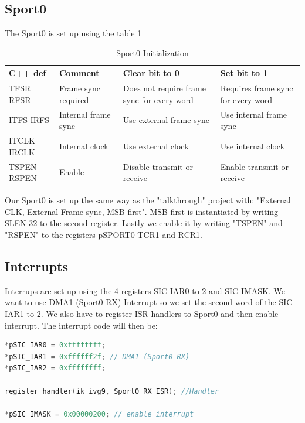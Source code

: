 \subsection{Sport0}
The Sport0 is set up using the table \ref{table:Sport0}
\begin{table}[htbp]
    \begin{tabular}{| p{1.5cm} | l | p{4.5cm} | p{4.5cm} |}
    \hline
    C++ def      & Comment                   & Clear bit to 0                                   & Set bit to 1                             \\ \hline
    TFSR RFSR   & Frame sync required 		 & Does not require frame sync for every word & Requires frame  					sync for every word \\ \hline
    ITFS IRFS   & Internal frame  					sync & Use external  					frame sync                    & Use internal  					frame sync            \\ \hline
    ITCLK IRCLK & Internal clock            & Use external  					clock                         & Use internal  					clock                 \\ \hline
    TSPEN RSPEN & Enable                    & Disable transmit  					or receive                & Enable transmit  					or receive         \\ \hline
    \end{tabular}
    \caption{Sport0 Initialization}
    \label{table:Sport0}
\end{table}
Our Sport0 is set up the same way as the "talkthrough" project with: "External CLK, External Frame sync, MSB first". MSB first is instantiated by writing SLEN$\_$32 to the second register. Lastly we enable it by writing "TSPEN" and "RSPEN" to the registers pSPORT0 TCR1 and RCR1.
\subsection{Interrupts}
Interrups are set up using the 4 registers SIC$\_$IAR0 to 2 and SIC$\_$IMASK. We want to use DMA1 (Sport0 RX) Interrupt so we set the second word of the SIC$\_$IAR1 to 2. We also have to register ISR handlers to Sport0 and then enable interrupt. The interrupt code will then be:
\begin{lstlisting}[language=C]
*pSIC_IAR0 = 0xffffffff;
*pSIC_IAR1 = 0xffffff2f; // DMA1 (Sport0 RX)
*pSIC_IAR2 = 0xffffffff;

register_handler(ik_ivg9, Sport0_RX_ISR); //Handler

*pSIC_IMASK = 0x00000200; // enable interrupt
\end{lstlisting}




